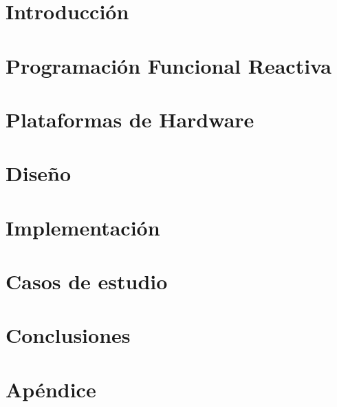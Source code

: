 \documentclass[12pt,a4paper,spanish]{book}
\begin{document}
\chapter{Introducción}


\chapter{Programación Funcional Reactiva}


\chapter{Plataformas de Hardware}


\chapter{Diseño}


\chapter{Implementación}


\chapter{Casos de estudio}


\chapter{Conclusiones}



\cleardoublepage
{}

%






\appendix
\cleardoublepage
\addappheadtotoc
\appendixpage

\chapter{Apéndice}

%
%


\end{document}
